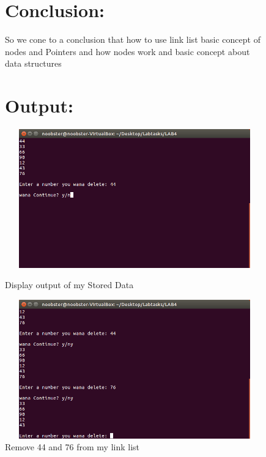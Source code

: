 \documentclass[11pt]{article}            %
\begin{document}
\begin{figure}
\section{Conclusion: }
So we cone to a conclusion that  how to use link list basic concept of nodes and Pointers and how nodes work   and basic concept about data structures \ \  \\
\section{Output: }
\centering
  \includegraphics[width=12cm,height=6cm,keepaspectratio]{3.png}
\caption{Display output of my Stored Data}
\label{Figure:3}   
 \includegraphics[width=12cm,height=6cm,keepaspectratio]{4.png}
\caption{Remove 44 and 76 from my link list}
\label{Figure:4}
\end{figure}
\end{document}

